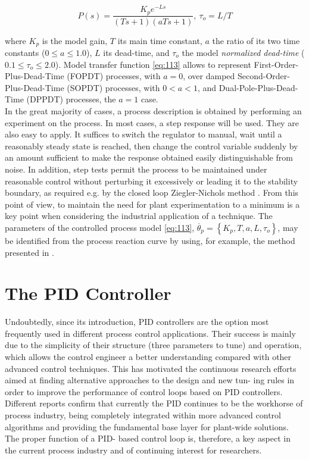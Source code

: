 \begin{equation}
    P(s) = \frac{K_p e^{-Ls}}{(Ts+1)(aTs+1)}, \ \tau_o = L/T \label{eq:113}
\end{equation}

\noindent where $K_p$ is the model gain, $T$ its main time constant, $a$ the ratio of its two time constants ($0 \leq a \leq 1.0$), $L$ its dead-time, and $\tau_o$ the model \emph{normalized dead-time} ($0.1 \leq \tau_o \leq 2.0$). Model transfer function \eqref{eq:113} allows to represent First-Order-Plus-Dead-Time (FOPDT) processes, with $a=0$, over damped Second-Order-Plus-Dead-Time (SOPDT) processes, with $0 < a < 1$, and Dual-Pole-Plus-Dead-Time (DPPDT) processes, the $a=1$ case.\\

In the great majority of cases, a process description is obtained by performing an experiment on the process. In most cases, a step response will be used. They are also easy to apply. It suffices to switch the regulator to manual, wait until a reasonably steady state is reached, then change the control variable suddenly by an amount sufficient to make the response obtained easily distinguishable from noise. In addition, step tests permit the process to be maintained under reasonable control without perturbing it excessively or leading it to the stability boundary, as required e.g. by the closed loop Ziegler-Nichols method \cite{astromhagglund2006}. From this point of view, to maintain the need for plant experimentation to a minimum is a key point when considering the industrial application of a technique. The parameters of the controlled process model \eqref{eq:113}, $\overline{\theta}_p = \left\{K_p, T, a, L, \tau_o \right\}$, may be identified from the process reaction curve by using, for example, the method presented in \cite{alfaro2006-1}. 



\section{The PID Controller}
\label{sec:3}
Undoubtedly, since its introduction, PID controllers are the option most frequently used in different process control applications. Their success is mainly due to the simplicity of their structure (three parameters to tune) and operation, which allows the control engineer a better understanding compared with other advanced control techniques. This has motivated the continuous research efforts aimed at finding alternative approaches to the design and new tun- ing rules in order to improve the performance of control loops based on PID controllers. Different reports confirm that currently the PID continues to be the workhorse of process industry, being completely integrated within more advanced control algorithms and providing the fundamental base layer for plant-wide solutions. The proper function of a PID- based control loop is, therefore, a key aspect in the current process industry and of continuing interest for researchers.\\

